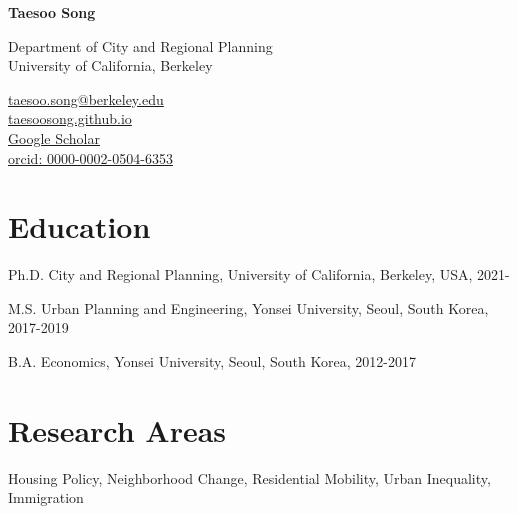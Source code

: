 \documentclass[12pt,letterpaper]{report}
\newcommand{\myname}{Taesoo Song}
\newcommand{\namefont}[1]{{\normalfont\bfseries\Huge{#1}}}
\newcommand{\listitemspace}{0.25em}
\renewenvironment{itemize}
{\begin{list}{}{\setlength{\leftmargin}{0em}
                \setlength{\parskip}{0em}
                \setlength{\itemsep}{\listitemspace}
                \setlength{\parsep}{\listitemspace}}}
{\end{list}}
\begin{document}
    \raggedright{}

    \namefont{\myname}

    \vspace{1em}
    \begin{minipage}[t]{0.700\textwidth}
        Department of City and Regional Planning\\
        University of California, Berkeley
    \end{minipage}
    \begin{minipage}[t]{0.295\textwidth}
        \flushright{}
        \href{mailto:taesoo.song@berkeley.edu}{taesoo.song@berkeley.edu} \\
        \href{https://taesoosong.github.io}{taesoosong.github.io}\\
        \href{https://scholar.google.com/citations?user=xM5Rc-EAAAAJ&hl=en}{Google Scholar}\\
        \href{https://orcid.org/0000-0002-0504-6353}{orcid: 0000-0002-0504-6353}
    \end{minipage}

    \section*{Education}
    
    \begin{tablist}
      \item[Ph.D.] \tab{}City and Regional Planning, University of California, Berkeley, USA, 2021-
      \item[M.S.] \tab{}Urban Planning and Engineering, Yonsei University, Seoul, South Korea, 2017-2019
      \item[B.A.] \tab{}Economics, Yonsei University, Seoul, South Korea, 2012-2017
    \end{tablist}
    
    \section*{Research Areas}
    \begin{itemize}
      \item Housing Policy, Neighborhood Change, Residential Mobility, Urban Inequality, Immigration
    \end{itemize}
  
\end{document}

